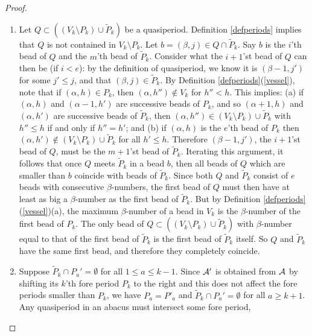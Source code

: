 \documentclass[12pt]{amsart}
\numberwithin{equation}{section}
\theoremstyle{definition}
\newcommand{\emp}{\emptyset}
\begin{document}
\begin{proof}
\begin{enumerate}
 \item Let $Q\subset((V_k\setminus P_k)\cup\tilde{P}_k)$ be a quasiperiod. Definition \ref{defperiods} implies that $Q$ is not contained in $V_k\setminus P_k$. Let $b=(\beta,j)\in Q\cap \tilde{P}_k$. Say $b$ is the $i$'th bead of $Q$ and the $m$'th bead of $\tilde{P}_k$. Consider what the $i+1$'st bead of $Q$ can then be (if $i<e$): by the definition of quasiperiod, we know it is $(\beta-1,j')$ for some $j'\leq j$, and that $(\beta,j)\in\tilde{P}_k$. By Definition \ref{defperiods}(\ref{vessel}), note that if $(\alpha,h)\in P_k$, then $(\alpha,h'')\notin V_k$ for $h''<h$. This implies: (a) if $(\alpha,h)$ and $(\alpha-1,h')$ are successive beads of $P_k$, and so $(\alpha+1,h)$ and $(\alpha,h')$ are successive beads of $\tilde{P}_k$, then $(\alpha,h'')\in (V_k\setminus P_k)\cup\tilde{P}_k$ with $h''\leq h$ if and only if $h''=h'$; and (b) if $(\alpha,h)$ is the $e$'th bead of $P_k$ then $(\alpha, h')\notin (V_k\setminus P_k)\cup\tilde{P}_k$ for all $h'\leq h$.  Therefore $(\beta-1,j')$, the $i+1$'st bead of $Q$, must be the $m+1$'st bead of $\tilde{P}_k$. Iterating this argument, it follows that once $Q$ meets $\tilde{P}_k$ in a bead $b$, then all beads of $Q$ which are smaller than $b$ coincide with beads of $\tilde{P}_k$. Since both $Q$ and $\tilde{P}_k$ consist of $e$ beads with consecutive $\beta$-numbers, the first bead of $Q$ must then have at least as big a $\beta$-number as the first bead of $\tilde{P}_k$. But by Definition \ref{defperiods}(\ref{vessel})(a), the maximum $\beta$-number of a bead in $V_k$ is the $\beta$-number of the first bead of $P_k$. The only bead of $Q\subset((V_k\setminus P_k)\cup\tilde{P}_k)$ with $\beta$-number equal to that of the first bead of $\tilde{P}_k$ is the first bead of $\tilde{P}_k$ itself. So $Q$ and $\tilde{P}_k$ have the same first bead, and therefore they completely coincide.
 \item Suppose $\tilde{P}_{k}\cap P_a'=\emp$ for all $1\leq a\leq k-1$.
Since $\mathcal{A}'$ is obtained from $\mathcal{A}$ by shifting its $k$'th fore period $P_k$ to the right and this does not affect the fore periods smaller than $P_k$, we have
$P_a=P'_a$ and $\tilde{P}_k\cap P_a'=\emp$ for all $a\geq k+1$.
Any quasiperiod in an abacus must intersect some fore period,

\end{enumerate}
\end{proof}
\end{document}
